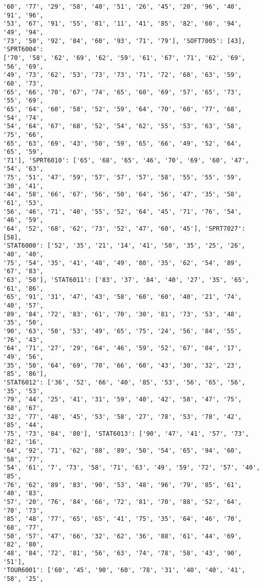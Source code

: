 \documentclass[11pt]{article}
\begin{document}
\begin{Verbatim}[commandchars=\\\{\}]
'60', '77', '29', '58', '40', '51', '26', '45', '20', '96', '40', '91', '96',
'53', '67', '91', '55', '81', '11', '41', '85', '82', '60', '94', '49', '94',
'73', '50', '92', '84', '60', '93', '71', '79'], 'SOFT7005': [43], 'SPRT6004':
['70', '58', '62', '69', '62', '59', '61', '67', '71', '62', '69', '56', '69',
'49', '73', '62', '53', '73', '73', '71', '72', '68', '63', '59', '60', '73',
'65', '66', '70', '67', '74', '65', '60', '69', '57', '65', '73', '55', '69',
'65', '64', '60', '58', '52', '59', '64', '70', '60', '77', '68', '54', '74',
'54', '64', '67', '68', '52', '54', '62', '55', '53', '63', '58', '75', '66',
'65', '63', '69', '43', '50', '59', '65', '66', '49', '52', '64', '65', '59',
'71'], 'SPRT6010': ['65', '68', '65', '46', '70', '69', '60', '47', '54', '63',
'75', '51', '47', '59', '57', '57', '57', '58', '55', '55', '59', '30', '41',
'44', '58', '66', '67', '56', '50', '64', '56', '47', '35', '58', '61', '53',
'56', '46', '71', '40', '55', '52', '64', '45', '71', '76', '54', '46', '59',
'64', '52', '68', '62', '73', '52', '47', '60', '45'], 'SPRT7027': [58],
'STAT6000': ['52', '35', '21', '14', '41', '50', '35', '25', '26', '40', '40',
'75', '54', '35', '41', '48', '49', '80', '35', '62', '54', '89', '67', '83',
'63', '50'], 'STAT6011': ['83', '37', '84', '40', '27', '35', '65', '61', '86',
'65', '91', '31', '47', '43', '58', '60', '60', '40', '21', '74', '40', '57',
'89', '84', '72', '83', '61', '70', '30', '81', '73', '53', '48', '35', '50',
'90', '63', '50', '53', '49', '65', '75', '24', '56', '84', '55', '76', '43',
'64', '71', '27', '29', '64', '46', '59', '52', '67', '84', '17', '49', '56',
'35', '50', '64', '69', '70', '66', '60', '43', '30', '32', '23', '85', '86'],
'STAT6012': ['36', '52', '66', '40', '85', '53', '56', '65', '56', '35', '53',
'79', '44', '25', '41', '31', '59', '40', '42', '58', '47', '75', '68', '67',
'32', '77', '48', '45', '53', '58', '27', '78', '53', '78', '42', '85', '44',
'75', '73', '84', '80'], 'STAT6013': ['90', '47', '41', '57', '73', '82', '16',
'64', '92', '71', '62', '88', '89', '50', '54', '65', '94', '60', '58', '77',
'54', '61', '7', '73', '58', '71', '63', '49', '59', '72', '57', '40', '85',
'76', '62', '89', '83', '90', '53', '48', '96', '79', '85', '61', '40', '83',
'57', '20', '76', '84', '66', '72', '81', '70', '88', '52', '64', '70', '73',
'85', '48', '77', '65', '65', '41', '75', '35', '64', '46', '70', '68', '77',
'50', '57', '47', '66', '32', '62', '36', '88', '61', '44', '69', '82', '80',
'48', '84', '72', '81', '56', '63', '74', '78', '58', '43', '90', '51'],
'TOUR6001': ['60', '45', '90', '60', '78', '31', '40', '40', '41', '58', '25',

\end{Verbatim}
\end{document}
